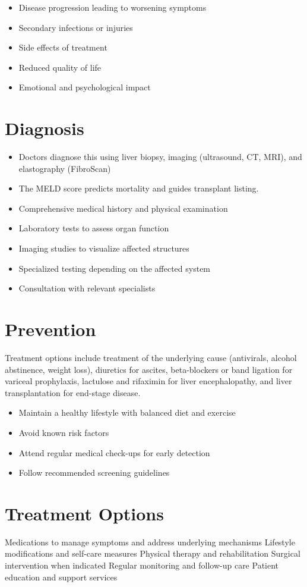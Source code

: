 \begin{itemize}[noitemsep]
  \item Disease progression leading to worsening symptoms
  \item Secondary infections or injuries
  \item Side effects of treatment
  \item Reduced quality of life
  \item Emotional and psychological impact
\end{itemize}
\section{Diagnosis}
\begin{itemize}[noitemsep]
  \item Doctors diagnose this using liver biopsy, imaging (ultrasound, CT, MRI), and elastography (FibroScan)
  \item The MELD score predicts mortality and guides transplant listing.
  \item Comprehensive medical history and physical examination
  \item Laboratory tests to assess organ function
  \item Imaging studies to visualize affected structures
  \item Specialized testing depending on the affected system
  \item Consultation with relevant specialists
\end{itemize}
\section{Prevention}
Treatment options include treatment of the underlying cause (antivirals, alcohol abstinence, weight loss), diuretics for ascites, beta-blockers or band ligation for variceal prophylaxis, lactulose and rifaximin for liver encephalopathy, and liver transplantation for end-stage disease.

\begin{itemize}[noitemsep]
  \item Maintain a healthy lifestyle with balanced diet and exercise
  \item Avoid known risk factors
  \item Attend regular medical check-ups for early detection
  \item Follow recommended screening guidelines
\end{itemize}
\section{Treatment Options}
Medications to manage symptoms and address underlying mechanisms Lifestyle modifications and self-care measures Physical therapy and rehabilitation Surgical intervention when indicated Regular monitoring and follow-up care Patient education and support services

